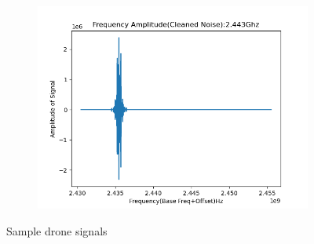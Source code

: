 \begin{itemize}
\begin{figure}[H]
        \centering
      \begin{subfigure}{0.5\textwidth}
        \includegraphics[width=0.9\linewidth]{ images/drone_2.443Ghz-FA-0.00.png }
        \label{fig:subim5.1}
      \end{subfigure}
      \caption{Sample drone signals}
      \label{fig:image2.1}
    \end{figure}


\end{itemize}
